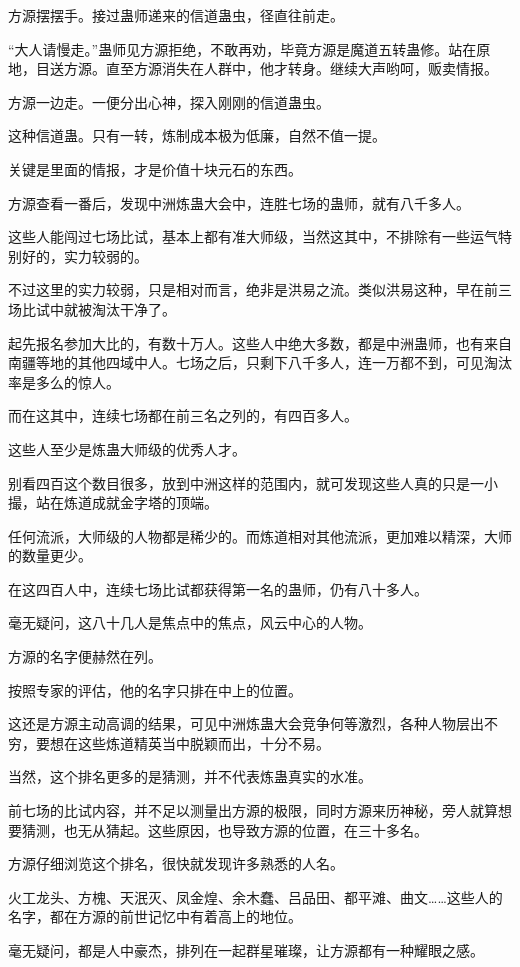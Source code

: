 \begin{this_body}
方源摆摆手。接过蛊师递来的信道蛊虫，径直往前走。

“大人请慢走。”蛊师见方源拒绝，不敢再劝，毕竟方源是魔道五转蛊修。站在原地，目送方源。直至方源消失在人群中，他才转身。继续大声哟呵，贩卖情报。

方源一边走。一便分出心神，探入刚刚的信道蛊虫。

这种信道蛊。只有一转，炼制成本极为低廉，自然不值一提。

关键是里面的情报，才是价值十块元石的东西。

方源查看一番后，发现中洲炼蛊大会中，连胜七场的蛊师，就有八千多人。

这些人能闯过七场比试，基本上都有准大师级，当然这其中，不排除有一些运气特别好的，实力较弱的。

不过这里的实力较弱，只是相对而言，绝非是洪易之流。类似洪易这种，早在前三场比试中就被淘汰干净了。

起先报名参加大比的，有数十万人。这些人中绝大多数，都是中洲蛊师，也有来自南疆等地的其他四域中人。七场之后，只剩下八千多人，连一万都不到，可见淘汰率是多么的惊人。

而在这其中，连续七场都在前三名之列的，有四百多人。

这些人至少是炼蛊大师级的优秀人才。

别看四百这个数目很多，放到中洲这样的范围内，就可发现这些人真的只是一小撮，站在炼道成就金字塔的顶端。

任何流派，大师级的人物都是稀少的。而炼道相对其他流派，更加难以精深，大师的数量更少。

在这四百人中，连续七场比试都获得第一名的蛊师，仍有八十多人。

毫无疑问，这八十几人是焦点中的焦点，风云中心的人物。

方源的名字便赫然在列。

按照专家的评估，他的名字只排在中上的位置。

这还是方源主动高调的结果，可见中洲炼蛊大会竞争何等激烈，各种人物层出不穷，要想在这些炼道精英当中脱颖而出，十分不易。

当然，这个排名更多的是猜测，并不代表炼蛊真实的水准。

前七场的比试内容，并不足以测量出方源的极限，同时方源来历神秘，旁人就算想要猜测，也无从猜起。这些原因，也导致方源的位置，在三十多名。

方源仔细浏览这个排名，很快就发现许多熟悉的人名。

火工龙头、方槐、天泯灭、凤金煌、余木蠢、吕品田、都平滩、曲文……这些人的名字，都在方源的前世记忆中有着高上的地位。

毫无疑问，都是人中豪杰，排列在一起群星璀璨，让方源都有一种耀眼之感。


\end{this_body}
